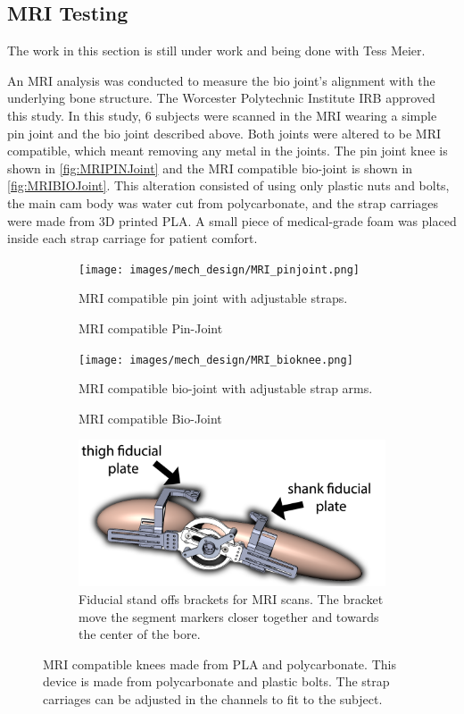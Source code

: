 \subsection{MRI Testing}

The work in this section is still under work and being done with Tess Meier. 


An MRI analysis was conducted to measure the bio joint's alignment with the underlying bone structure. The Worcester Polytechnic Institute IRB approved this study. In this study, 6 subjects were scanned in the MRI wearing a simple pin joint and the bio joint described above. Both joints were altered to be MRI compatible, which meant removing any metal in the joints. The pin joint knee is shown in \autoref{fig:MRIPINJoint} and the MRI compatible bio-joint is shown in \autoref{fig:MRIBIOJoint}. This alteration consisted of using only plastic nuts and bolts, the main cam body was water cut from polycarbonate, and the strap carriages were made from 3D printed PLA. A small piece of medical-grade foam was placed inside each strap carriage for patient comfort.    


\begin{figure}
    \begin{subfigure}{\textwidth}
        \centering
        \captionsetup{justification=centering}
        \texttt{[image: images/mech\_design/MRI\_pinjoint.png]}
        \caption{MRI compatible Pin-Joint}{MRI compatible pin joint with adjustable straps.  }
        \label{fig:MRIPINJoint}
    \end{subfigure}
    \begin{subfigure}{\textwidth}
        \centering
        \texttt{[image: images/mech\_design/MRI\_bioknee.png]}
          \captionsetup{justification=centering}
        \caption{MRI compatible Bio-Joint}{MRI compatible bio-joint with adjustable strap arms.}
        \label{fig:MRIBIOJoint}
    \end{subfigure}    
            \begin{subfigure}{\textwidth}
        \centering
        \includegraphics[width=0.75\linewidth]{images/mech_design/mri_knee_with_markers_edit.png}
          \captionsetup{justification=centering}
        \caption[fiducial stand off]{Fiducial stand offs brackets for MRI scans. The bracket move the segment markers closer together and towards the center of the bore.}
        \label{fig:MRIMarkerStandoff}
    \end{subfigure}
    \caption[MRI Compatible Knees]{MRI compatible knees made from PLA and polycarbonate. This device is made from polycarbonate and plastic bolts. The strap carriages can be adjusted in the channels to fit to the subject.}
    \label{fig:MRIKnees}
\end{figure}



